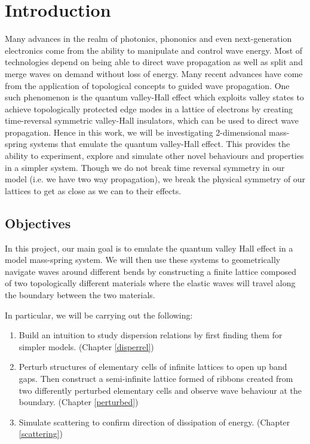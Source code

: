 \chapter{Introduction}
Many advances in the realm of photonics, phononics and even next-generation
electronics come from the ability to manipulate and control wave
energy.\cite{gravwaves,emcloak,diremi,antennasol,THz,absorbing,toposplit,negrefraclens}
Most of technologies depend on being able to direct wave propagation as well as
split and merge waves on demand without loss of energy. Many recent advances
have come from the application of topological concepts to guided wave
propagation.\cite{singlevalley,qshe,valleyhall,2dtopophoto} One such phenomenon
is the quantum valley-Hall effect which exploits valley states to achieve
topologically protected edge modes in a lattice of electrons by creating
time-reversal symmetric valley-Hall
insulators,\cite{allsitopo,dielectopo,sonicvalley} which can be used to direct
wave propagation. Hence in this work, we will be investigating 2-dimensional
mass-spring systems that emulate the quantum valley-Hall effect. This provides
the ability to experiment, explore and simulate other novel behaviours and
properties in a simpler system. Though we do not break time reversal symmetry
in our model (i.e. we have two way propagation), we break the physical symmetry
of our lattices to get as close as we can to their effects.

\section{Objectives}
In this project, our main goal is to emulate the quantum valley Hall
effect\cite{mos2, valleyhall} in a model mass-spring system. We will then use
these systems to geometrically navigate waves around different bends by
constructing a finite lattice composed of two topologically different materials
where the elastic waves will travel along the boundary between the two
materials.

In particular, we will be carrying out the following:

\begin{enumerate}
\item Build an intuition to study dispersion relations by first finding them
      for simpler models. (Chapter \ref{disperrel})
\item Perturb structures of elementary cells of infinite lattices to open up
      band gaps. Then construct a semi-infinite lattice formed of ribbons
      created from two differently perturbed elementary cells and observe wave
      behaviour at the boundary. (Chapter \ref{perturbed})
\item Simulate scattering to confirm direction of dissipation of energy.
      (Chapter \ref{scattering})
\end{enumerate}


